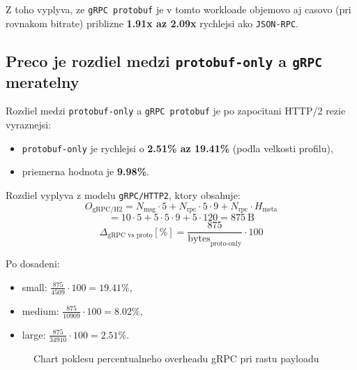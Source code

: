 \documentclass[12pt,a4paper]{report}
\begin{document}
Z toho vyplyva, ze \texttt{gRPC protobuf} je v tomto workloade
objemovo aj casovo (pri rovnakom bitrate) priblizne \textbf{1.91x az 2.09x}
rychlejsi ako \texttt{JSON-RPC}.

\subsection{Preco je rozdiel medzi \texttt{protobuf-only} a \texttt{gRPC} meratelny}

Rozdiel medzi \texttt{protobuf-only} a \texttt{gRPC protobuf} je po zapocitani
HTTP/2 rezie vyraznejsi:
\begin{itemize}
  \item \texttt{protobuf-only} je rychlejsi o \textbf{2.51\% az 19.41\%}
  (podla velkosti profilu),
  \item priemerna hodnota je \textbf{9.98\%}.
\end{itemize}

Rozdiel vyplyva z modelu \texttt{gRPC/HTTP2}, ktory obsahuje:
\begin{equation}
O_{\text{gRPC/H2}} =
N_{\text{msg}}\cdot5 +
N_{\text{rpc}}\cdot5\cdot9 +
N_{\text{rpc}}\cdot H_{\text{meta}}
\end{equation}
\begin{equation}
= 10\cdot5 + 5\cdot5\cdot9 + 5\cdot120 = 875~\text{B}
\end{equation}
\begin{equation}
\Delta_{\text{gRPC vs proto}} [\%] =
\frac{875}{\text{bytes}_{\text{proto-only}}}\cdot 100
\end{equation}

Po dosadeni:
\begin{itemize}
  \item small: $\frac{875}{4509}\cdot100 = 19.41\%$,
  \item medium: $\frac{875}{10909}\cdot100 = 8.02\%$,
  \item large: $\frac{875}{34910}\cdot100 = 2.51\%$.
\end{itemize}

\begin{figure}[htbp]
\centering
{}
\caption{Chart poklesu percentualneho overheadu gRPC pri rastu payloadu}
\label{fig:grpc-overhead-profile-chart}
\end{figure}
\end{document}
